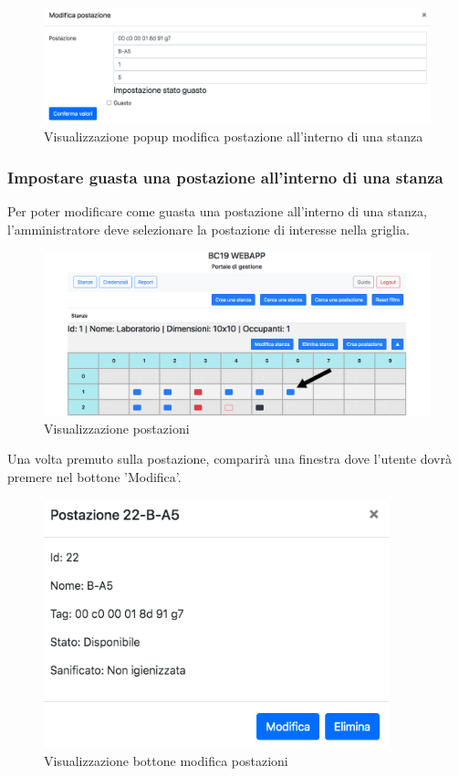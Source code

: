 \begin{figure}[H]
	\centering
	\includegraphics[width=15cm]{res/images/editWorkstation.png}
	\caption{Visualizzazione popup modifica postazione all'interno di una stanza}
\end{figure}

\subsubsection{Impostare guasta una postazione all'interno di una stanza}
Per poter modificare come guasta una postazione all'interno di una stanza, l'amministratore deve selezionare la postazione di interesse nella griglia.
\begin{figure}[H]
	\centering
	\includegraphics[width=15cm]{res/images/postDaEliminare.png}
	\caption{Visualizzazione postazioni}
\end{figure}
Una volta premuto sulla postazione, comparirà una finestra dove l'utente dovrà premere nel bottone 'Modifica'.
\begin{figure}[H]
	\centering
	\includegraphics[width=10cm]{res/images/bottoneCestinoWorkstation.png}
	\caption{Visualizzazione bottone modifica postazioni}
\end{figure}
